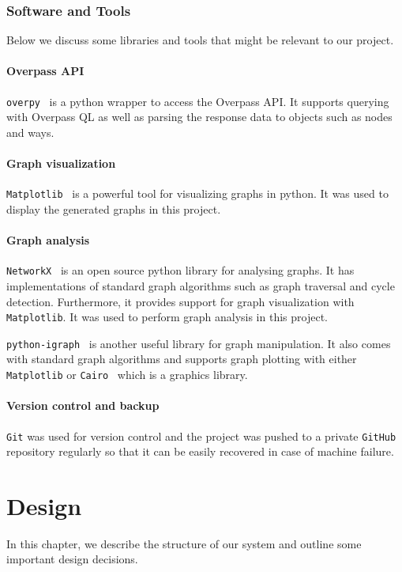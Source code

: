 \documentclass[12pt,a4paper]{report}
\begin{document}
\subsection{Software and Tools}
Below we discuss some libraries and tools that might be relevant to our project.

\subsubsection*{Overpass API}
\texttt{overpy}~\cite{overpy} is a python wrapper to access the Overpass API. It supports querying with Overpass QL as well as parsing the response data to objects such as nodes and ways. 

\subsubsection*{Graph visualization}
\texttt{Matplotlib}~\cite{Hunter:2007} is a powerful tool for visualizing graphs in python. It was used to display the generated graphs in this project.

\subsubsection*{Graph analysis}
\texttt{NetworkX}~\cite{SciPyProceedings_11} is an open source python library for analysing graphs. It has implementations of standard graph algorithms such as graph traversal and cycle detection. Furthermore, it provides support for graph visualization with \texttt{Matplotlib}. It was used to perform graph analysis in this project.

\texttt{python-igraph}~\cite{igraph} is another useful library for graph manipulation. It also comes with standard graph algorithms and supports graph plotting with either \texttt{Matplotlib} or \texttt{Cairo}~\cite{cairo} which is a graphics library.

\subsubsection*{Version control and backup}
\texttt{Git} was used for version control and the project was pushed to a private \texttt{GitHub} repository regularly so that it can be easily recovered in case of machine failure.

\chapter{Design}\label{chapter:design}
In this chapter, we describe the structure of our system and outline some important design decisions.
\end{document}
